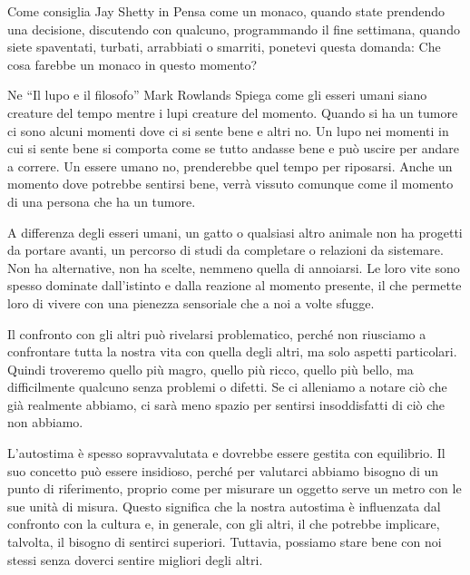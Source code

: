 \documentclass[12pt]{book} %
\begin{document}
\begin{mdframed}[linewidth=1pt]
Come consiglia Jay Shetty in Pensa come un monaco, quando state prendendo una
decisione, discutendo con qualcuno, programmando il fine settimana, quando siete spaventati, turbati, arrabbiati o
smarriti, ponetevi questa domanda: Che cosa farebbe un monaco in questo momento? 

Ne “Il lupo e il filosofo” Mark Rowlands Spiega come gli esseri umani siano creature del tempo mentre i lupi creature del momento. Quando si ha un
tumore ci sono alcuni momenti dove ci si sente bene e altri no. Un lupo nei momenti in cui si sente bene si comporta
come se tutto andasse bene e può uscire per andare a correre. Un essere umano no, prenderebbe quel tempo per riposarsi.
Anche un momento dove potrebbe sentirsi bene, verrà vissuto comunque come il momento di una persona che ha un tumore.

A differenza degli esseri umani, un gatto o qualsiasi altro animale non ha progetti da portare avanti, un percorso di studi da completare o relazioni da sistemare. Non ha alternative, non ha scelte, nemmeno quella di annoiarsi. Le loro vite sono spesso dominate dall'istinto e dalla reazione al momento presente, il che permette loro di vivere con una pienezza sensoriale che a noi a volte sfugge. 
\end{mdframed}

Il confronto con gli altri può rivelarsi problematico, perché non riusciamo a confrontare tutta la nostra vita con quella
degli altri, ma solo aspetti particolari. Quindi troveremo quello più magro, quello più ricco, quello più bello, ma difficilmente qualcuno senza problemi o difetti. Se ci alleniamo a notare ciò che già realmente abbiamo, ci sarà meno spazio per sentirsi
insoddisfatti di ciò che non abbiamo. 

L'autostima è spesso sopravvalutata e dovrebbe essere gestita con equilibrio. Il suo concetto può essere insidioso, perché per valutarci abbiamo bisogno di un punto di riferimento, proprio come per misurare un oggetto serve un metro con le sue unità di misura. Questo significa che la nostra autostima è influenzata dal confronto con la cultura e, in generale, con gli altri, il che potrebbe implicare, talvolta, il bisogno di sentirci superiori.
Tuttavia, possiamo stare bene con noi stessi senza doverci sentire migliori degli altri.
\end{document}

